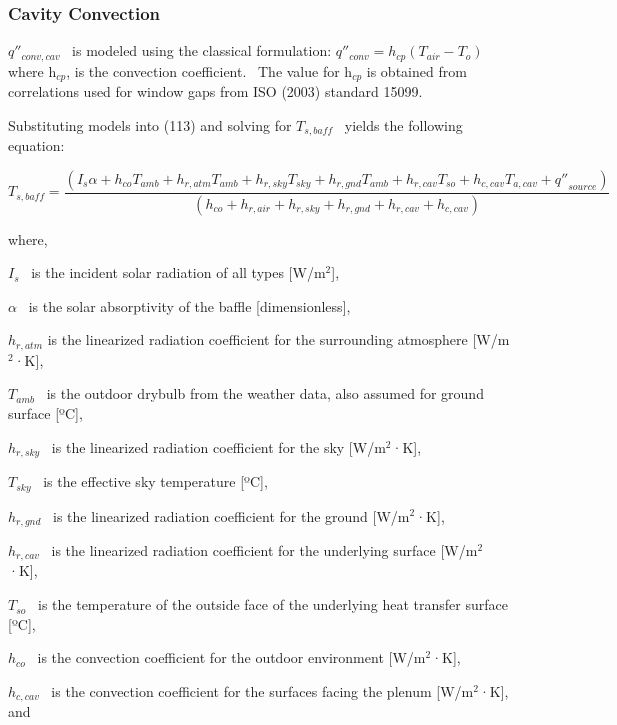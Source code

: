 \subsubsection{Cavity Convection}\label{cavity-convection}

\(q''_{conv,cav}\) ~is modeled using the classical formulation: \(q''_{conv} = h_{cp}(T_{air} - T_{o})\) ~ where h\(_{cp}\), is the convection coefficient.~ The value for h\(_{cp}\) is obtained from correlations used for window gaps from ISO (2003) standard 15099.

Substituting models into (113) and solving for \({T_{s,baff}}\) ~yields the following equation:

\begin{equation}
{T_{s,baff}} = \frac{{\left( {{I_s}\alpha  + {h_{co}}{T_{amb}} + {h_{r,atm}}{T_{amb}} + {h_{r,sky}}{T_{sky}} + {h_{r,gnd}}{T_{amb}} + {h_{r,cav}}{T_{so}} + {h_{c,cav}}{T_{a,cav}} + {{q''}_{source}}} \right)}}{{\left( {{h_{co}} + {h_{r,air}} + {h_{r,sky}} + {h_{r,gnd}} + {h_{r,cav}} + {h_{c,cav}}} \right)}}
\end{equation}

where,

\({I_s}\) ~is the incident solar radiation of all types {[}W/m\(^{2}\){]},

\(\alpha\) ~is the solar absorptivity of the baffle {[}dimensionless{]},

\({h_{r,atm}}\) is the linearized radiation coefficient for the surrounding atmosphere {[}W/m\(^{2}\)·K{]},

\({T_{amb}}\) ~is the outdoor drybulb from the weather data, also assumed for ground surface {[}ºC{]},

\({h_{r,sky}}\) ~is the linearized radiation coefficient for the sky {[}W/m\(^{2}\)·K{]},

\({T_{sky}}\) ~is the effective sky temperature {[}ºC{]},

\({h_{r,gnd}}\) ~is the linearized radiation coefficient for the ground {[}W/m\(^{2}\)·K{]},

\({h_{r,cav}}\) ~is the linearized radiation coefficient for the underlying surface {[}W/m\(^{2}\)·K{]},

\({T_{so}}\) ~is the temperature of the outside face of the underlying heat transfer surface {[}ºC{]},

\({h_{co}}\) ~is the convection coefficient for the outdoor environment {[}W/m\(^{2}\)·K{]},

\({h_{c,cav}}\) ~is the convection coefficient for the surfaces facing the plenum {[}W/m\(^{2}\)·K{]}, and

